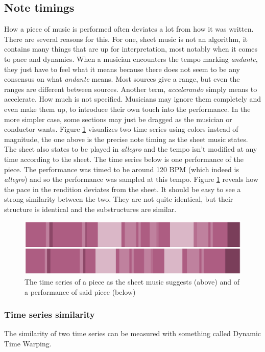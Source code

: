 \subsection{Note timings}
How a piece of music is performed often deviates a lot from how it was written. There are several reasons for this. For one, sheet music is not an algorithm, it contains many things that are up for interpretation, most notably when it comes to pace and dynamics. When a musician encounters the tempo marking \textit{andante}, they just have to feel what it means because there does not seem to be any consensus on what \textit{andante} means. Most sources give a range, but even the ranges are different between sources. Another term, \textit{accelerando} simply means to accelerate. How much is not specified. Musicians may ignore them completely and even make them up, to introduce their own touch into the performance. In the more simpler case, some sections may just be dragged as the musician or conductor wants. Figure \ref{fig:performance-sheet} visualizes two time series using colors instead of magnitude, the one above is the precise note timing as the sheet music states. The sheet also states to be played in \textit{allegro} and the tempo isn't modified at any time according to the sheet. The time series below is one performance of the piece. The performance was timed to be around 120 BPM (which indeed is \textit{allegro}) and so the performance was sampled at this tempo. Figure \ref{fig:performance-sheet} reveals how the pace in the rendition deviates from the sheet. It should be easy to see a strong similarity between the two. They are not quite identical, but their structure is identical and the substructures are similar. 

\begin{figure}[ht]
    \centering
    \includegraphics[width=\textwidth]{./images/performance-sheet.png}
    \caption{The time series of a piece as the sheet music suggests (above) and of a performance of said piece (below)\label{fig:performance-sheet}}
\end{figure}

\subsubsection{Time series similarity}
The similarity of two time series can be measured with something called Dynamic Time Warping. 

